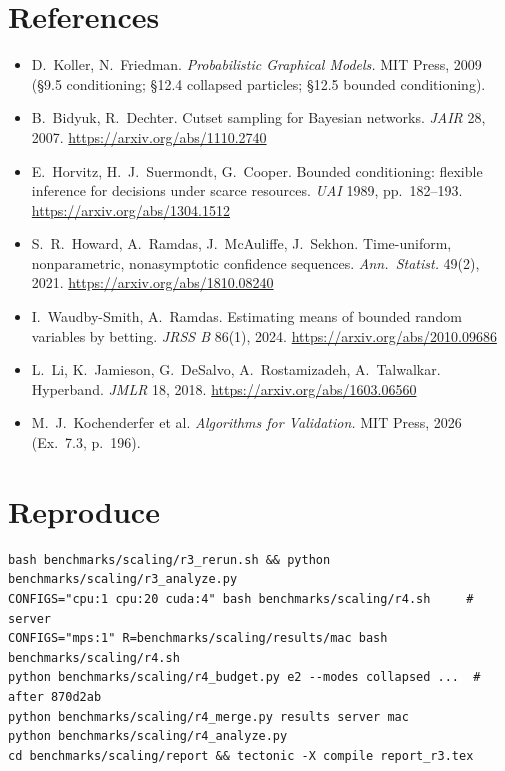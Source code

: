 \documentclass[10pt,a4paper]{article}
\begin{document}
\section*{References}
\begin{itemize}\small
\item D.\ Koller, N.\ Friedman. \emph{Probabilistic Graphical Models.} MIT Press, 2009 (§9.5 conditioning; §12.4 collapsed particles; §12.5 bounded conditioning).
\item B.\ Bidyuk, R.\ Dechter. Cutset sampling for Bayesian networks. \emph{JAIR} 28, 2007. \url{https://arxiv.org/abs/1110.2740}
\item E.\ Horvitz, H.\ J.\ Suermondt, G.\ Cooper. Bounded conditioning: flexible inference for decisions under scarce resources. \emph{UAI} 1989, pp.\ 182--193. \url{https://arxiv.org/abs/1304.1512}
\item S.\ R.\ Howard, A.\ Ramdas, J.\ McAuliffe, J.\ Sekhon. Time-uniform, nonparametric, nonasymptotic confidence sequences. \emph{Ann.\ Statist.} 49(2), 2021. \url{https://arxiv.org/abs/1810.08240}
\item I.\ Waudby-Smith, A.\ Ramdas. Estimating means of bounded random variables by betting. \emph{JRSS B} 86(1), 2024. \url{https://arxiv.org/abs/2010.09686}
\item L.\ Li, K.\ Jamieson, G.\ DeSalvo, A.\ Rostamizadeh, A.\ Talwalkar. Hyperband. \emph{JMLR} 18, 2018. \url{https://arxiv.org/abs/1603.06560}
\item M.\ J.\ Kochenderfer et al. \emph{Algorithms for Validation.} MIT Press, 2026 (Ex.\ 7.3, p.\ 196).
\end{itemize}

\section*{Reproduce}
\begin{verbatim}
bash benchmarks/scaling/r3_rerun.sh && python benchmarks/scaling/r3_analyze.py
CONFIGS="cpu:1 cpu:20 cuda:4" bash benchmarks/scaling/r4.sh     # server
CONFIGS="mps:1" R=benchmarks/scaling/results/mac bash benchmarks/scaling/r4.sh
python benchmarks/scaling/r4_budget.py e2 --modes collapsed ...  # after 870d2ab
python benchmarks/scaling/r4_merge.py results server mac
python benchmarks/scaling/r4_analyze.py
cd benchmarks/scaling/report && tectonic -X compile report_r3.tex
\end{verbatim}
\end{document}

